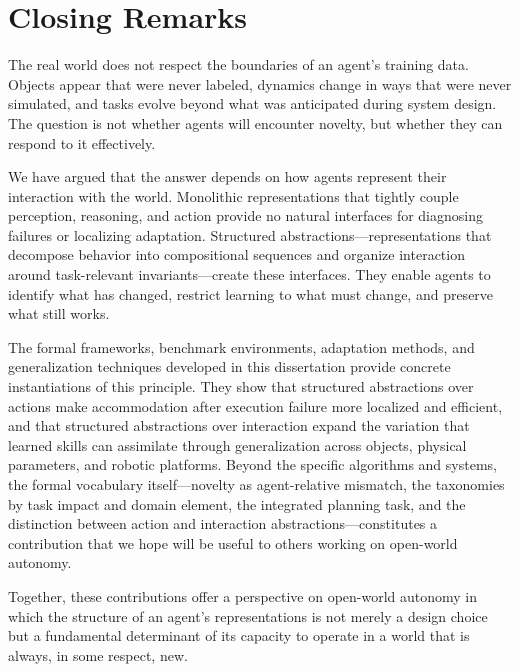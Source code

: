 \section{Closing Remarks}
\label{sec:closing}

The real world does not respect the boundaries of an agent's training data. Objects appear that were never labeled, dynamics change in ways that were never simulated, and tasks evolve beyond what was anticipated during system design. The question is not whether agents will encounter novelty, but whether they can respond to it effectively.

We have argued that the answer depends on how agents represent their interaction with the world. Monolithic representations that tightly couple perception, reasoning, and action provide no natural interfaces for diagnosing failures or localizing adaptation. Structured abstractions---representations that decompose behavior into compositional sequences and organize interaction around task-relevant invariants---create these interfaces. They enable agents to identify what has changed, restrict learning to what must change, and preserve what still works.

The formal frameworks, benchmark environments, adaptation methods, and generalization techniques developed in this dissertation provide concrete instantiations of this principle. They show that structured abstractions over actions make accommodation after execution failure more localized and efficient, and that structured abstractions over interaction expand the variation that learned skills can assimilate through generalization across objects, physical parameters, and robotic platforms. Beyond the specific algorithms and systems, the formal vocabulary itself---novelty as agent-relative mismatch, the taxonomies by task impact and domain element, the integrated planning task, and the distinction between action and interaction abstractions---constitutes a contribution that we hope will be useful to others working on open-world autonomy.

Together, these contributions offer a perspective on open-world autonomy in which the structure of an agent's representations is not merely a design choice but a fundamental determinant of its capacity to operate in a world that is always, in some respect, new.
